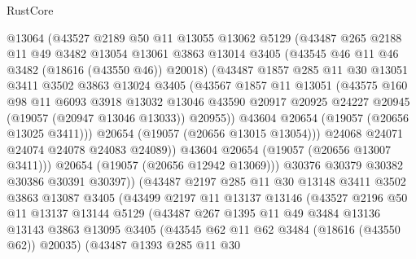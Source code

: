 \begin{lexlean}{RustCore}
\begin{coremodule}
              @13064
              (@43527
                @2189
                @50
                @11
                @13055
                @13062
                @5129
                (@43487
                  @265
                  @2188
                  @11
                  @49
                  @3482
                  @13054
                  @13061
                  @3863
                  @13014
                  @3405
                  (@43545 @46 @11 @46 @3482 (@18616 (@43550 @46)) @20018)
                  (@43487
                    @1857
                    @285
                    @11
                    @30
                    @13051
                    @3411
                    @3502
                    @3863
                    @13024
                    @3405
                    (@43567
                      @1857
                      @11
                      @13051
                      (@43575
                        @160
                        @98
                        @11
                        @6093
                        @3918
                        @13032
                        @13046
                        @43590
                        @20917
                        @20925
                        @24227
                        @20945
                        (@19057 (@20947 @13046 @13033))
                        @20955))
                    @43604
                    @20654
                    (@19057 (@20656 @13025 @3411)))
                  @20654
                  (@19057 (@20656 @13015 @13054)))
                @24068
                @24071
                @24074
                @24078
                @24083
                @24089))
            @43604
            @20654
            (@19057 (@20656 @13007 @3411)))
          @20654
          (@19057 (@20656 @12942 @13069)))
        @30376
        @30379
        @30382
        @30386
        @30391
        @30397))
    (@43487
      @2197
      @285
      @11
      @30
      @13148
      @3411
      @3502
      @3863
      @13087
      @3405
      (@43499
        @2197
        @11
        @13137
        @13146
        (@43527
          @2196
          @50
          @11
          @13137
          @13144
          @5129
          (@43487
            @267
            @1395
            @11
            @49
            @3484
            @13136
            @13143
            @3863
            @13095
            @3405
            (@43545 @62 @11 @62 @3484 (@18616 (@43550 @62)) @20035)
            (@43487
              @1393
              @285
              @11
              @30

\end{coremodule}
\end{lexlean}
